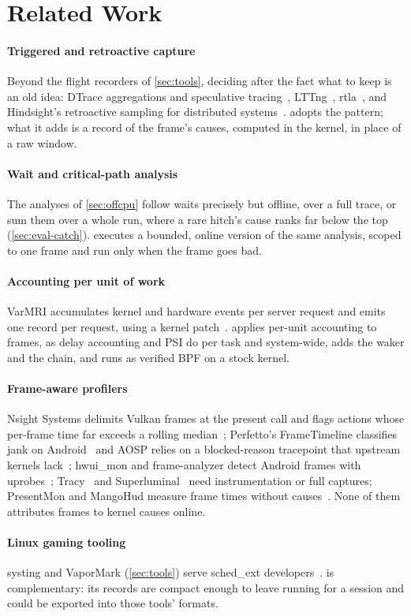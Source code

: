 \section{Related Work}
\label{sec:related}

\paragraph{Triggered and retroactive capture} Beyond the flight recorders of
\autoref{sec:tools}, deciding after the fact what to keep is an old idea:
DTrace aggregations and speculative tracing~\cite{cantrill2004dtrace},
LTTng~\cite{lttng}, rtla~\cite{rtla}, and Hindsight's retroactive sampling
for distributed systems~\cite{zhang2023hindsight}. \sys adopts the pattern;
what it adds is a record of the frame's causes, computed in the kernel, in
place of a raw window.

\paragraph{Wait and critical-path analysis} The analyses of
\autoref{sec:offcpu} follow waits precisely but offline, over a full trace,
or sum them over a whole run, where a rare hitch's cause ranks far below the
top (\autoref{sec:eval-catch}). \sys executes a bounded, online version of
the same analysis, scoped to one frame and run only when the frame goes
bad.

\paragraph{Accounting per unit of work} VarMRI accumulates kernel and
hardware events per server request and emits one record per request, using
a kernel patch~\cite{varmri}. \sys applies per-unit accounting to frames,
as delay accounting and PSI do per task and system-wide, adds the waker and
the chain, and runs as verified BPF on a stock kernel.

\paragraph{Frame-aware profilers} Nsight Systems delimits Vulkan frames at the
present call and flags actions whose per-frame time far exceeds a rolling
median~\cite{nsight}; Perfetto's FrameTimeline classifies jank on
Android~\cite{perfetto-frametimeline} and AOSP relies on a blocked-reason
tracepoint that upstream kernels lack~\cite{aosp-blocked-reason}; hwui\_mon
and frame-analyzer detect Android frames with
uprobes~\cite{hwui-mon,frame-analyzer}; Tracy~\cite{tracy} and
Superluminal~\cite{superluminal} need instrumentation or full captures;
PresentMon and MangoHud measure frame times without
causes~\cite{presentmon,mangohud}. None of them attributes frames to kernel
causes online.

\paragraph{Linux gaming tooling} systing and VaporMark (\autoref{sec:tools})
serve sched\_ext developers~\cite{scx}. \sys is complementary: its records
are compact enough to leave running for a session and could be exported
into those tools' formats.
